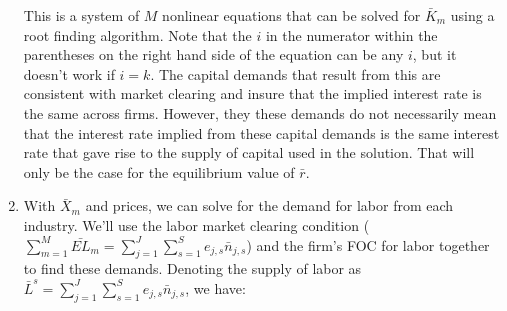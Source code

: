 \documentclass[letterpaper,12pt]{article}
\theoremstyle{definition}
\begin{document}
\begin{spacing}{1.5}
\begin{enumerate}

	This is a system of $M$ nonlinear equations that can be solved for $\bar{K}_{m}$ using a root finding algorithm.  Note that the $i$ in the numerator within the parentheses on the right hand side of the equation can be any $i$, but it doesn't work if $i=k$.  The capital demands that result from this are consistent with market clearing and insure that the implied interest rate is the same across firms.  However, they these demands do not necessarily mean that the interest rate implied from these capital demands is the same interest rate that gave rise to the supply of capital used in the solution.  That will only be the case for the equilibrium value of $\bar{r}$.  
	
\item With $\bar{X}_{m}$ and prices, we can solve for the demand for labor from each industry.  We'll use the labor market clearing condition ($\sum_{m=1}^{M} \bar{EL}_{m}=\sum_{j=1}^{J}\sum_{s=1}^{S}e_{j,s} \bar{n}_{j,s}$) and the firm's FOC for labor together to find these demands.  Denoting the supply of labor as $\bar{L}^{s}=\sum_{j=1}^{J}\sum_{s=1}^{S} e_{j,s}\bar{n}_{j,s}$, we have:


\end{enumerate}
\end{spacing}
\end{document}
